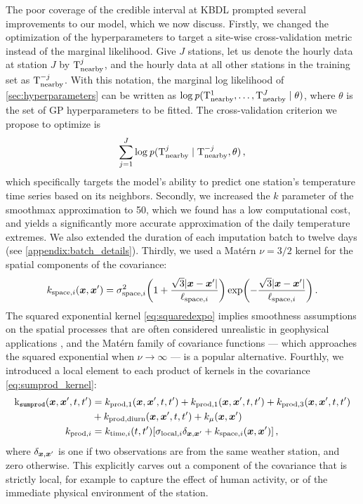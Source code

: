 The poor coverage of the credible interval at KBDL prompted several improvements to our model, which we now discuss.
Firstly, we changed the optimization of the hyperparameters to target a site-wise cross-validation metric
instead of the marginal likelihood.
Give $J$ stations, let us denote the hourly data at station $J$ by $\mathrm{T}_{\mathrm{nearby}}^j$,
and the hourly data at all other stations in the training set as $\mathrm{T}_{\mathrm{nearby}}^{-j}$.
With this notation, the marginal log likelihood of \autoref{sec:hyperparameters}
can be written as $\log \operatorname{\mathit{p}}(\mathrm{T}_{\mathrm{nearby}}^1, \dotsc, \mathrm{T}_{\mathrm{nearby}}^J \mid \theta)$,
where $\theta$ is the set of GP hyperparameters to be fitted.
The cross-validation criterion we propose to optimize is
\begin{equation}
    \sum_{j=1}^J \log \operatorname{\mathit{p}}(\mathrm{T}_{\mathrm{nearby}}^j \mid \mathrm{T}_{\mathrm{nearby}}^{-j}, \theta)\,,
    \label{eq:cv_criterion}
\end{equation}
which specifically targets the model's ability to predict one station's temperature time series
based on its neighbors.
Secondly, we increased the $k$ parameter of the smoothmax approximation to 50,
which we found has a low computational cost, and yields a significantly more
accurate approximation of the daily temperature extremes.
We also extended the duration of each imputation batch to twelve days (see \autoref{appendix:batch_details}).
Thirdly, we used a Mat\'ern $\nu=3/2$ kernel for the spatial components of the covariance:
\begin{equation}
    k_{\subspace{},i}(\xvec, \xvec') = \sigma^2_{\subspace{},i} \del{1 + \frac{\sqrt{3}|\xvec-\xvec'|}{\ell_{\subspace,i}}}\exp\del{-\frac{\sqrt{3}|\xvec-\xvec'|}{\ell_{\subspace,i}}}
    \,.
    \label{eq:kmatern}
\end{equation}
The squared exponential kernel \autoref{eq:squaredexpo} implies smoothness assumptions
on the spatial processes that are often considered unrealistic in geophysical applications
\citep{stein2012interpolation}, and the Mat\'ern family of covariance functions ---
which approaches the squared exponential when $\nu \to \infty$ ---
is a popular alternative.
Fourthly, we introduced a local element to each product of kernels in the covariance \autoref{eq:sumprod_kernel}:
\begin{equation}
\begin{aligned}
    \ksumprod(\xvec,\xvec',t,t') &= 
           k_{\subprod{},1}(\xvec,\xvec',t,t') + k_{\subprod{},1}(\xvec,\xvec',t,t') + k_{\subprod{},3}(\xvec,\xvec',t,t') \\
        &+ k_{\subprod{},\subdiurn}(\xvec,\xvec',t,t') + k_\mu(\xvec, \xvec') \\
    k_{\subprod{},i} &= k_{\subtime{},i}(t,t') \sbr{\sigma_{\sublocal{},i} \delta_{\xvec,\xvec'} +  k_{\subspace{},i}(\xvec,\xvec')}
    \,,
\end{aligned}
\label{eq:maternlocal}
\end{equation}
where $\delta_{\bm{x},\bm{x}'}$ is one if two observations are from the same weather station,
and zero otherwise.
This explicitly carves out a component of the covariance
that is strictly local, for example to capture the effect of human activity,
or of the immediate physical environment of the station.


